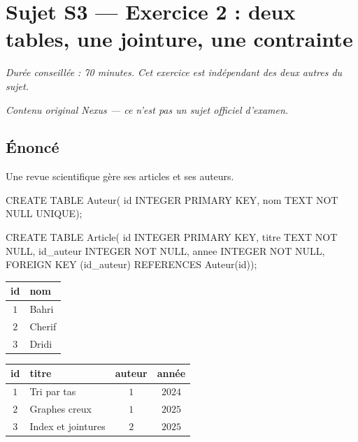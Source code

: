 \section*{Sujet S3 --- Exercice 2 : deux tables, une jointure, une contrainte}

\textit{Durée conseillée : 70 minutes. Cet exercice est indépendant des deux
autres du sujet.}

\medskip
\textit{Contenu original Nexus --- ce n'est pas un sujet officiel d'examen.}

\subsection*{Énoncé}

Une revue scientifique gère ses articles et ses auteurs.

\begin{sql}
CREATE TABLE Auteur(
    id INTEGER PRIMARY KEY,
    nom TEXT NOT NULL UNIQUE);

CREATE TABLE Article(
    id INTEGER PRIMARY KEY,
    titre TEXT NOT NULL,
    id_auteur INTEGER NOT NULL,
    annee INTEGER NOT NULL,
    FOREIGN KEY (id_auteur) REFERENCES Auteur(id));
\end{sql}

\begin{center}
\begin{tabular}{|c|l|}
\hline
\textbf{id} & \textbf{nom} \\
\hline
$1$ & Bahri \\
\hline
$2$ & Cherif \\
\hline
$3$ & Dridi \\
\hline
\end{tabular}
\qquad
\begin{tabular}{|c|l|c|c|}
\hline
\textbf{id} & \textbf{titre} & \textbf{auteur} & \textbf{année} \\
\hline
$1$ & Tri par tas & $1$ & $2024$ \\
\hline
$2$ & Graphes creux & $1$ & $2025$ \\
\hline
$3$ & Index et jointures & $2$ & $2025$ \\
\hline
\end{tabular}
\end{center}

